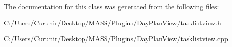 The documentation for this class was generated from the following files\+:\begin{DoxyCompactItemize}
\item 
C\+:/\+Users/\+Curunir/\+Desktop/\+M\+A\+S\+S/\+Plugins/\+Day\+Plan\+View/tasklistview.\+h\item 
C\+:/\+Users/\+Curunir/\+Desktop/\+M\+A\+S\+S/\+Plugins/\+Day\+Plan\+View/tasklistview.\+cpp\end{DoxyCompactItemize}
